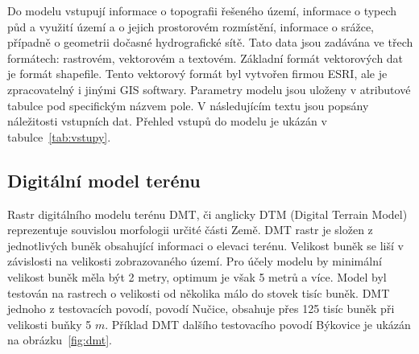 


Do modelu vstupují informace o topografii řešeného území, informace o typech půd a využití území a o jejich prostorovém rozmístění, informace o srážce, případně o geometrii dočasné hydrografické sítě.
Tato data jsou zadávána ve třech formátech: rastrovém, vektorovém a textovém. 
Základní formát vektorových dat je formát shapefile. Tento vektorový formát byl vytvořen firmou ESRI, ale je zpracovatelný i jinými GIS softwary. Parametry modelu jsou uloženy v atributové tabulce pod specifickým názvem pole. 
V následujícím textu jsou popsány náležitosti vstupních dat. 
% 
Přehled vstupů do modelu je ukázán v tabulce~\ref{tab:vstupy}.


% 

% 
% 
% 
% 
% 
% 
% 









\subsection{Digitální model terénu} \label{sec:vstupdmt} 

Rastr digitálního modelu terénu DMT, či anglicky DTM (Digital Terrain Model) reprezentuje souvislou morfologii určité části Země. DMT rastr je složen z jednotlivých buněk obsahující informaci o elevaci terénu.  Velikost buněk se liší v závislosti na velikosti zobrazovaného území. Pro účely modelu \smod by minimální velikost buněk měla být 2 metry, optimum je však 5 metrů a více. Model byl testován na rastrech o velikosti od několika málo do stovek tisíc buněk. DMT jednoho z testovacích povodí, povodí Nučice, obsahuje přes 125 tisíc buněk při velikosti buňky 5 $m$. Příklad DMT dalšího testovacího povodí Býkovice je ukázán na obrázku~\ref{fig:dmt}.


